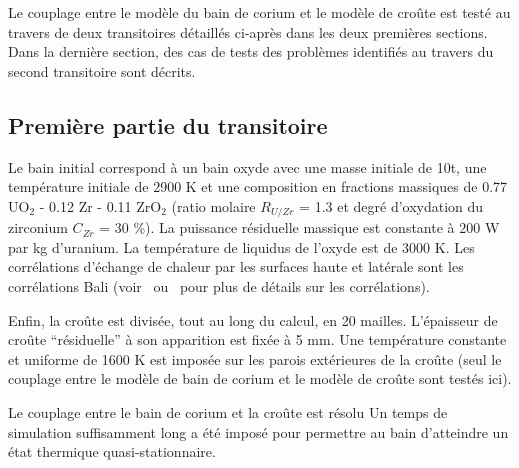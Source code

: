 Le couplage entre le modèle du bain de corium et le modèle de croûte est testé au travers de deux transitoires détaillés ci-après dans les deux premières sections. Dans la dernière section, des cas de tests des problèmes identifiés au travers du second transitoire sont décrits.

\subsection{Première partie du transitoire}
Le bain initial correspond à un bain oxyde avec une masse initiale de 10t, une température initiale de 2900 K et une composition en fractions massiques de 0.77 UO$_2$ - 0.12 Zr - 0.11 ZrO$_2$ (ratio molaire $R_{U/Zr}$ = 1.3 et degré  d'oxydation du zirconium $C_{Zr}$ = 30 \%). La puissance résiduelle massique est constante à $200$ W par kg d'uranium. La température de liquidus de l'oxyde est de 3000 K. Les corrélations d'échange de chaleur par les surfaces haute et latérale sont les corrélations Bali (voir~\cite{Bonnet1999} ou~\cite{Tourniaire2009a} pour plus de détails sur les corrélations). 

Enfin, la croûte est divisée, tout au long du calcul, en 20 mailles. L'épaisseur de croûte ``résiduelle'' à son apparition est fixée à 5 mm. Une température constante et uniforme de 1600 K est imposée sur les parois extérieures de la croûte (seul le couplage entre le modèle de bain de corium et le modèle de croûte sont testés ici).

Le couplage entre le bain de corium et la croûte est résolu
Un temps de simulation suffisamment long a été imposé pour permettre au bain d'atteindre un état thermique quasi-stationnaire.




